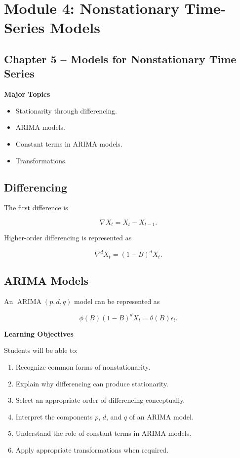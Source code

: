 \documentclass[11pt,a4paper]{article}
\newcommand{\ARIMA}{\operatorname{ARIMA}}
\begin{document}
\section{Module 4: Nonstationary Time-Series Models}

\subsection{Chapter 5 -- Models for Nonstationary Time Series}

\textbf{Major Topics}

\begin{itemize}
    \item Stationarity through differencing.
    \item ARIMA models.
    \item Constant terms in ARIMA models.
    \item Transformations.
\end{itemize}

\subsection{Differencing}

The first difference is

\[
\nabla X_t=X_t-X_{t-1}.
\]

Higher-order differencing is represented as

\[
\nabla^d X_t=(1-B)^dX_t.
\]

\subsection{ARIMA Models}

An $\ARIMA(p,d,q)$ model can be represented as

\[
\phi(B)(1-B)^dX_t
=
\theta(B)\epsilon_t.
\]

\textbf{Learning Objectives}

Students will be able to:

\begin{enumerate}
    \item Recognize common forms of nonstationarity.
    \item Explain why differencing can produce stationarity.
    \item Select an appropriate order of differencing conceptually.
    \item Interpret the components $p$, $d$, and $q$ of an ARIMA model.
    \item Understand the role of constant terms in ARIMA models.
    \item Apply appropriate transformations when required.
\end{enumerate}
\end{document}
